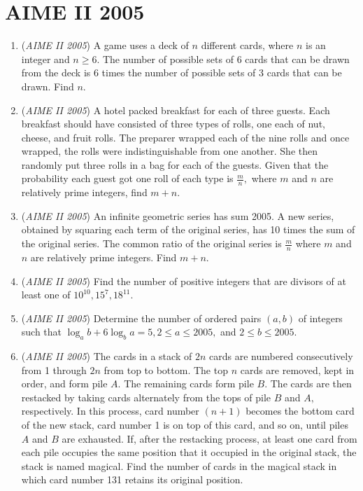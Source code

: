 \section{AIME II 2005}
        \begin{enumerate}
        	\item (\textit{AIME II 2005}) A game uses a deck of $n$ different cards, where $n$ is an integer and $n \geq 6.$ The number of possible sets of 6 cards that can be drawn from the deck is 6 times the number of possible sets of 3 cards that can be drawn. Find $n.$


	\item (\textit{AIME II 2005}) A hotel packed breakfast for each of three guests. Each breakfast should have consisted of three types of rolls, one each of nut, cheese, and fruit rolls. The preparer wrapped each of the nine rolls and once wrapped, the rolls were indistinguishable from one another. She then randomly put three rolls in a bag for each of the guests. Given that the probability each guest got one roll of each type is $\frac mn,$ where $m$ and $n$ are relatively prime integers, find $m+n.$


	\item (\textit{AIME II 2005}) An infinite geometric series has sum 2005. A new series, obtained by squaring each term of the original series, has 10 times the sum of the original series. The common ratio of the original series is $\frac mn$ where $m$ and $n$ are relatively prime integers. Find $m+n.$


	\item (\textit{AIME II 2005}) Find the number of positive integers that are divisors of at least one of $10^{10},15^7,18^{11}.$


	\item (\textit{AIME II 2005}) Determine the number of ordered pairs $(a,b)$ of integers such that $\log_a b + 6\log_b a=5, 2 \leq a \leq 2005,$ and $2 \leq b \leq 2005.$


	\item (\textit{AIME II 2005}) The cards in a stack of $2n$ cards are numbered consecutively from 1 through $2n$ from top to bottom. The top $n$ cards are removed, kept in order, and form pile $A.$ The remaining cards form pile $B.$ The cards are then restacked by taking cards alternately from the tops of pile $B$ and $A,$ respectively. In this process, card number $(n+1)$ becomes the bottom card of the new stack, card number 1 is on top of this card, and so on, until piles $A$ and $B$ are exhausted. If, after the restacking process, at least one card from each pile occupies the same position that it occupied in the original stack, the stack is named magical. Find the number of cards in the magical stack in which card number 131 retains its original position.



\end{enumerate}
